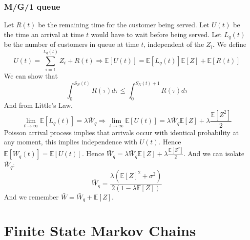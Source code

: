 \documentclass[12pt, openany]{report}
\newcommand{\E}{\mathbb{E}}
\theoremstyle{definition}
\begin{document}
\subsection{M/G/1 queue}
Let $R(t)$ be the remaining time for the customer being served. Let $U(t)$ be the time an arrival at time $t$ would have to wait before being served. Let $L_q(t)$ be the number of customers in queue at time $t$, independent of the $Z_i$. We define 
\begin{equation}
	U(t)=\sum_{i=1}^{L_q(t)}Z_i + R(t) \Longrightarrow \E[U(t)]=\E[L_q(t)]\E[Z]+\E[R(t)]
\end{equation}
We can show that 
\begin{equation}
	\int_0^{S_N(t)} R(\tau)d\tau \le \int_0^{S_N(t)+1} R(\tau)d\tau
\end{equation}
And from Little's Law,
\begin{equation}
	\lim_{t\to \infty} \E[L_q(t)] = \lambda \bar W_q \Longrightarrow \lim_{t\to \infty} \E[U(t)] = \lambda \bar W_q \E[Z] + \lambda \frac{\E[Z^2]}{2} 
\end{equation}
Poisson arrival process implies that arrivals occur with identical probability at any moment, this implies independence with $U(t)$. Hence $\E[W_q(t)]=\E[U(t)]$. Hence $\bar W_q = \lambda \bar W_q\E[Z] + \lambda \frac{\E[Z^2]}{2}$. And we can isolate $\bar W_q$:
\begin{equation}
	\bar W_q = \frac{\lambda (\E[Z]^2+\sigma^2)}{2(1-\lambda \E[Z])}
\end{equation}
And we remember $\bar W = \bar W_q + \E[Z]$.\\
\chapter{Finite State Markov Chains}
\end{document}
